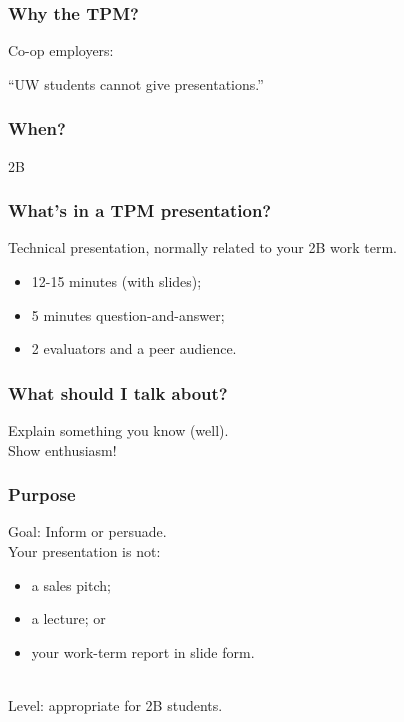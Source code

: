 \documentclass{beamer}
\begin{document}
\begin{frame}
\frametitle{Why the TPM?}

\Large
Co-op employers:

\begin{center}
``UW students cannot give presentations.''
\end{center}

\end{frame}

\begin{frame}

\frametitle{When?}

\begin{center}
{\Large 2B}
\end{center}

\end{frame}

\begin{frame}

\frametitle{What's in a TPM presentation?}

Technical presentation, normally related to your 2B work term.

\begin{itemize}
\item 12-15 minutes (with slides);
\item 5 minutes question-and-answer; 
\item 2 evaluators and a peer audience.
\end{itemize}

\end{frame}

\begin{frame}

\frametitle{What should I talk about?}

\Large
Explain something you know (well).\\[2em]

Show enthusiasm!

\end{frame}

\begin{frame}

\frametitle{Purpose}

\Large
Goal: Inform or persuade.\\[2em]

Your presentation is not:
\begin{itemize}
\item a sales pitch;
\item a lecture; or
\item your work-term report in slide form.
\end{itemize}
~\\[1em]

Level: appropriate for 2B students.

\end{frame}
\end{document}
